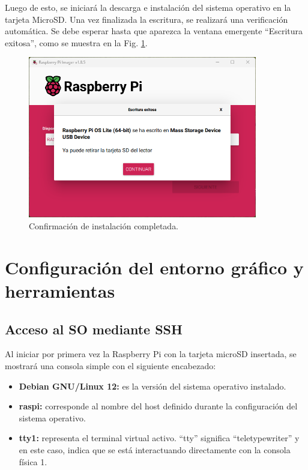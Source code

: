\documentclass[12pt]{article}
\begin{document}
Luego de esto, se iniciará la descarga e instalación del sistema operativo en la tarjeta MicroSD. Una vez finalizada la escritura, se realizará una verificación automática. Se debe esperar hasta que aparezca la ventana emergente ``Escritura exitosa'', como se muestra en la Fig. \ref{RPI_listo}.

\begin{figure}[H]
    \centering
    \includegraphics[width=10cm]{rpi_listo.png}
    \caption{Confirmación de instalación completada.}
    \label{RPI_listo}
\end{figure}

\newpage
\section{Configuración del entorno gráfico y herramientas}


\subsection{Acceso al SO mediante SSH}
Al iniciar por primera vez la Raspberry Pi con la tarjeta microSD insertada, se mostrará una consola simple con el siguiente encabezado:

\begin{itemize}
    \item \textbf{Debian GNU/Linux 12:} es la versión del sistema operativo instalado.
    \item \textbf{raspi:} corresponde al nombre del host definido durante la configuración del sistema operativo.
    \item \textbf{tty1:} representa el terminal virtual activo. ``tty'' significa ``teletypewriter'' y en este caso, indica que se está interactuando directamente con la consola física 1.
\end{itemize}
\end{document}
